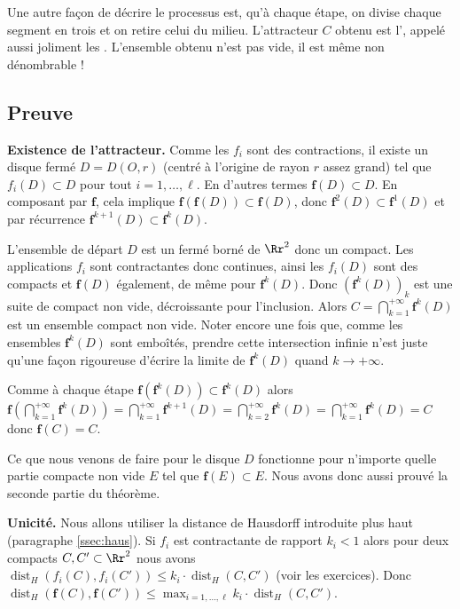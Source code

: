 \documentclass[11pt,class=report,crop=false]{standalone}
\DeclareMathOperator{\dist}{dist}
\begin{document}
Une autre façon de décrire le processus est, qu'à chaque étape,
on divise chaque segment en trois et on retire celui du milieu.
L'attracteur $C$ obtenu est l', appelé
aussi joliment les .
L'ensemble obtenu n'est pas vide, il est même non dénombrable !


\subsection{Preuve}


\textbf{Existence de l'attracteur.}
Comme les $f_i$ sont des contractions, il existe un disque fermé $D= D(O,r)$
(centré à l'origine de rayon $r$ assez grand) tel que
$f_i(D) \subset D$ pour tout $i=1,\ldots,\ell$.
En d'autres termes $\mathbf{f}(D) \subset D$.
En composant par $\mathbf{f}$, cela implique $\mathbf{f}\left(\mathbf{f}(D) \right) \subset \mathbf{f}(D)$,
donc $\mathbf{f}^2(D) \subset \mathbf{f}^1(D)$
et par récurrence $\mathbf{f}^{k+1}(D) \subset \mathbf{f}^k(D)$.


L'ensemble de départ $D$ est un fermé borné de $\Rr^2$ donc un compact.
Les applications $f_i$ sont contractantes donc continues, ainsi
les $f_i(D)$ sont des compacts et $\mathbf{f}(D)$ également, de même pour $\mathbf{f}^k(D)$.
Donc  $\left(\mathbf{f}^k(D)\right)_k$ est une suite de compact non vide,
décroissante pour l'inclusion. Alors $C = \bigcap_{k=1}^{+\infty} \mathbf{f}^k(D)$
est un ensemble compact non vide. 
Noter encore une fois que, comme les ensembles $\mathbf{f}^k(D)$ sont emboîtés, 
prendre cette intersection infinie n'est juste qu'une façon rigoureuse d'écrire
la limite de $\mathbf{f}^k(D)$ quand $k\to +\infty$. 

Comme à chaque étape $\mathbf{f}\left(\mathbf{f}^k(D)\right) \subset \mathbf{f}^k(D)$
alors  $\mathbf{f}\left(\bigcap_{k=1}^{+\infty} \mathbf{f}^{k}(D)\right) 
= \bigcap_{k=1}^{+\infty} \mathbf{f}^{k+1}(D) = \bigcap_{k=2}^{+\infty} \mathbf{f}^{k}(D) =
\bigcap_{k=1}^{+\infty} \mathbf{f}^{k}(D) = C$ donc $\mathbf{f}(C) = C$.

Ce que nous venons de faire pour le disque $D$ fonctionne pour n'importe quelle partie
compacte non vide $E$ tel que $\mathbf{f}(E) \subset E$. Nous avons donc aussi 
prouvé la seconde partie du théorème.

\bigskip

\textbf{Unicité.}
Nous allons utiliser la distance de Hausdorff introduite plus haut (paragraphe \ref{ssec:haus}).
Si $f_i$ est contractante de rapport $k_i < 1$ alors pour deux compacts
$C,C' \subset \Rr^2$ nous avons 
$\dist_H (f_i(C),f_i(C')) \le k_i \cdot \dist_H (C,C')$ (voir les exercices).
Donc $\dist_H (\mathbf{f}(C),\mathbf{f}(C')) \le \max_{i=1,\ldots,\ell} k_i  \cdot  \dist_H (C,C')$.
\end{document}
